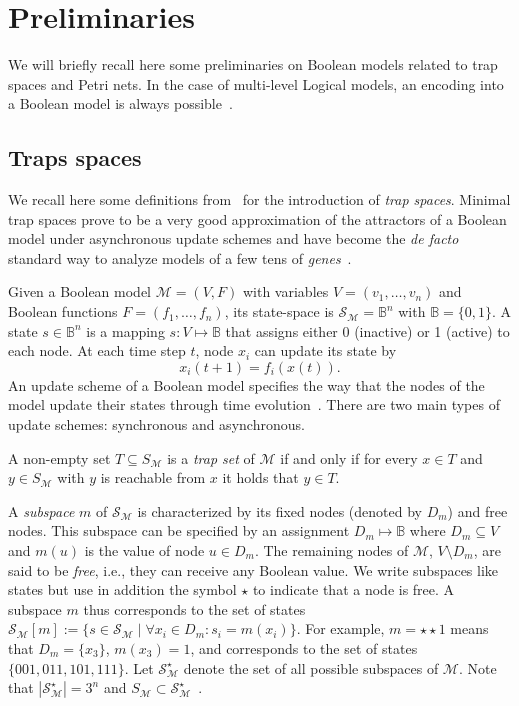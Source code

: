 \documentclass[runningheads]{llncs}
\begin{document}
\section{Preliminaries}

We will briefly recall here some preliminaries on Boolean models related to trap spaces and Petri nets.
In the case of multi-level Logical models, an encoding into a Boolean model is always possible~\cite{Didier2011}.

\subsection{Traps spaces}

We recall here some definitions from~\cite{klarner2015computing} for the introduction of \emph{trap spaces}.
Minimal trap spaces prove to be a very good approximation of the attractors of a Boolean model under asynchronous update schemes and have become the \emph{de facto} standard way to analyze models of a few tens of \emph{genes}~\cite{klarner2017pyboolnet,cifuentes2020control}.

Given a Boolean model \(\mathcal{M} = (V, F)\) with variables \(V=(v_{1},\dots,v_{n})\) and Boolean functions \(F=(f_{1},\dots,f_{n})\), its state-space is \(\mathcal{S}_{\mathcal{M}} =\mathbb{B}^{n}\) with \(\mathbb{B} = \{0, 1\}\). A state \(s \in \mathbb{B}^{n}\) is a mapping \(s : V \mapsto \mathbb{B}\) that assigns either 0 (inactive) or 1 (active) to each node. At each time step \(t\), node \(x_i\) can update its state by
\[x_i(t + 1) = f_i(x(t)).\] An update scheme of a Boolean model specifies the way that the nodes of the model update their states through time evolution~\cite{thomas1991regulatory}. There are two main types of update schemes: synchronous and asynchronous.

A non-empty set \(T \subseteq S_{\mathcal{M}}\) is a \emph{trap set} of \(\mathcal{M}\) if and only if for every \(x \in T\) and \(y \in S_{\mathcal{M}}\) with \(y\) is reachable from \(x\) it holds that \(y \in T\).

A \emph{subspace} \(m\) of \(\mathcal{S}_{\mathcal{M}}\) is characterized by its fixed nodes (denoted by \(D_m\)) and free nodes.
This subspace can be specified by an assignment \(D_m \mapsto \mathbb{B}\) where \(D_m \subseteq V\) and \(m(u)\) is the value of node \(u \in D_m\).
The remaining nodes of \(\mathcal{M}\), \(V \setminus D_m\), are said to be \emph{free}, i.e., they can receive any Boolean value.
We write subspaces like states but use in addition the symbol \(\star\) to indicate that a node is free.
A subspace \(m\) thus corresponds to the set of states \(\mathcal{S}_{\mathcal{M}}[m] := \{s \in \mathcal{S}_{\mathcal{M}}\;|\;\forall x_i \in D_m : s_i = m(x_i)\}\).
For example, \(m = \star\star1\) means that \(D_m = \{x_3\}\), \(m(x_3) = 1\), and corresponds to the set of states \(\{001, 011, 101, 111\}\).
Let \(\mathcal{S}_{\mathcal{M}}^{\star}\) denote the set of all possible subspaces of \(\mathcal{M}\). Note that \(\left|\mathcal{S}_{\mathcal{M}}^{\star}\right| = 3^n\) and \(S_{\mathcal{M}} \subset \mathcal{S}_{\mathcal{M}}^{\star}\)~\cite{klarner2015computing}.
\end{document}
